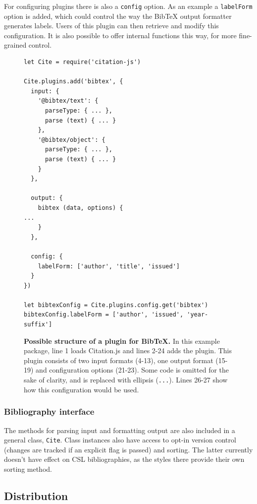 \documentclass[fleqn,10pt,lineno]{wlpeerj} %
\begin{document}
For configuring plugins there is also a \texttt{config} option. As an example a \texttt{labelForm} option is added, which could control the way the BibTeX output formatter generates labels. Users of this plugin can then retrieve and modify this configuration. It is also possible to offer internal functions this way, for more fine-grained control.

\begin{figure}[ht]
\centering
\begin{verbatim}
let Cite = require('citation-js')

Cite.plugins.add('bibtex', {
  input: {
    '@bibtex/text': {
      parseType: { ... },
      parse (text) { ... }
    },
    '@bibtex/object': {
      parseType: { ... },
      parse (text) { ... }
    }
  },

  output: {
    bibtex (data, options) {
...
    }
  },

  config: {
    labelForm: ['author', 'title', 'issued']
  }
})

let bibtexConfig = Cite.plugins.config.get('bibtex')
bibtexConfig.labelForm = ['author', 'issued', 'year-suffix']
\end{verbatim}
\caption{\textbf{Possible structure of a plugin for BibTeX.}
In this example package, line 1 loads Citation.js and lines 2-24 adds the plugin. This plugin consists of two input formats (4-13), one output format (15-19) and configuration options (21-23). Some code is omitted for the sake of clarity, and is replaced with ellipsis (\texttt{...}). Lines 26-27 show how this configuration would be used.
}
\label{code:plugin}
\end{figure}

\subsubsection*{Bibliography interface}

The methods for parsing input and formatting output are also included in a general class, \texttt{Cite}. Class instances also have access to opt-in version control (changes are tracked if an explicit flag is passed) and sorting. The latter currently doesn't have effect on CSL bibliographies, as the styles there provide their own sorting method.

\subsection*{Distribution}
\end{document}
